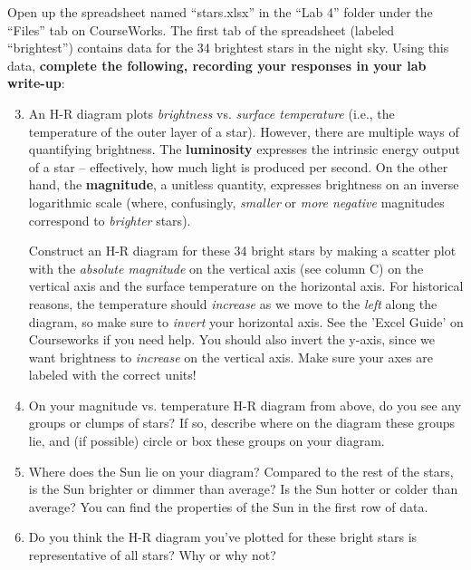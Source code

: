\documentclass[11pt]{article}
\begin{document}
Open up the spreadsheet named ``stars.xlsx'' in the ``Lab 4'' folder under the ``Files'' tab on CourseWorks. The first tab of the spreadsheet (labeled ``brightest'') contains data for the 34 brightest stars in the night sky. Using this data, \textbf{complete the following, recording your responses in your lab write-up}:
\begin{enumerate}
    \setcounter{enumi}{2}
    
    \item An H-R diagram plots \emph{brightness} vs. \emph{surface temperature} (i.e., the temperature of the outer layer of a star). However, there are multiple ways of quantifying brightness. The \textbf{luminosity} expresses the intrinsic energy output of a star -- effectively, how much light is produced per second. On the other hand, the \textbf{magnitude}, a unitless quantity, expresses brightness on an inverse logarithmic scale (where, confusingly, \emph{smaller} or \emph{more negative} magnitudes correspond to \emph{brighter} stars).
    
     Construct an H-R diagram for these 34 bright stars by making a scatter plot with the \emph{absolute magnitude} on the vertical axis (see column C) on the vertical axis and the surface temperature on the horizontal axis. For historical reasons, the temperature should \emph{increase} as we move to the \emph{left} along the diagram, so make sure to \emph{invert} your horizontal axis. See the 'Excel Guide' on Courseworks if you need help. You should also invert the y-axis, since we want brightness to \emph{increase} on the vertical axis. Make sure your axes are labeled with the correct units!

    
    \item On your magnitude vs. temperature H-R diagram from above, do you see any groups or clumps of stars? If so, describe where on the diagram these groups lie, and (if possible) circle or box these groups on your diagram.
    
    \item Where does the Sun lie on your diagram? Compared to the rest of the stars, is the Sun brighter or dimmer than average? Is the Sun hotter or colder than average? You can find the properties of the Sun in the first row of data.
    
    \item Do you think the H-R diagram you've plotted for these bright stars is representative of all stars? Why or why not?
    
\end{enumerate}
\end{document}
